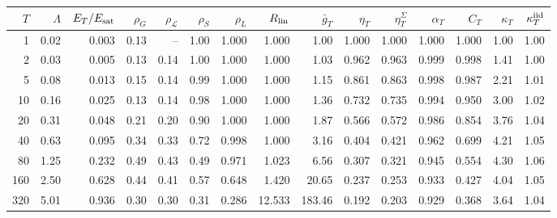 \begin{tabular}{rrrrrrrrrrrrrrr}
\toprule
$T$ & $\Lambda$ & $E_T/E_{\rm sat}$ & $\rho_G$ & $\rho_{\mathcal L}$ & $\rho_S$ & $\rho_L$ & $R_{\rm lin}$ & $\bar g_T$ & $\eta_T$ & $\eta^\Sigma_T$ & $\alpha_T$ & $C_T$ & $\kappa_T$ & $\kappa^{\rm iid}_T$\\
\midrule
1 & 0.02 & 0.003 & 0.13 & -- & 1.00 & 1.000 & 1.000 & 1.00 & 1.000 & 1.000 & 1.000 & 1.000 & 1.00 & 1.00\\
2 & 0.03 & 0.005 & 0.13 & 0.14 & 1.00 & 1.000 & 1.000 & 1.03 & 0.962 & 0.963 & 0.999 & 0.998 & 1.41 & 1.00\\
5 & 0.08 & 0.013 & 0.15 & 0.14 & 0.99 & 1.000 & 1.000 & 1.15 & 0.861 & 0.863 & 0.998 & 0.987 & 2.21 & 1.01\\
10 & 0.16 & 0.025 & 0.13 & 0.14 & 0.98 & 1.000 & 1.000 & 1.36 & 0.732 & 0.735 & 0.994 & 0.950 & 3.00 & 1.02\\
20 & 0.31 & 0.048 & 0.21 & 0.20 & 0.90 & 1.000 & 1.000 & 1.87 & 0.566 & 0.572 & 0.986 & 0.854 & 3.76 & 1.04\\
40 & 0.63 & 0.095 & 0.34 & 0.33 & 0.72 & 0.998 & 1.000 & 3.16 & 0.404 & 0.421 & 0.962 & 0.699 & 4.21 & 1.05\\
80 & 1.25 & 0.232 & 0.49 & 0.43 & 0.49 & 0.971 & 1.023 & 6.56 & 0.307 & 0.321 & 0.945 & 0.554 & 4.30 & 1.06\\
160 & 2.50 & 0.628 & 0.44 & 0.41 & 0.57 & 0.648 & 1.420 & 20.65 & 0.237 & 0.253 & 0.933 & 0.427 & 4.04 & 1.05\\
320 & 5.01 & 0.936 & 0.30 & 0.30 & 0.31 & 0.286 & 12.533 & 183.46 & 0.192 & 0.203 & 0.929 & 0.368 & 3.64 & 1.04\\
\bottomrule
\end{tabular}
